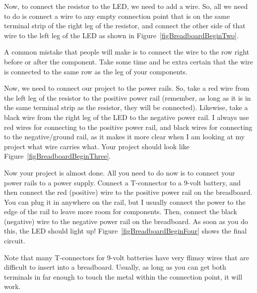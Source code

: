 Now, to connect the resistor to the LED, we need to add a wire.
So, all we need to do is connect a wire to any empty connection point that is on the same terminal strip of the right leg of the resistor, and connect the other side of that wire to the left leg of the LED as shown in Figure~\ref{figBreadboardBeginTwo}.


A common mistake that people will make is to connect the wire to the row right before or after the component.
Take some time and be extra certain that the wire is connected to the same row as the leg of your components.

Now, we need to connect our project to the power rails.
So, take a red wire from the left leg of the resistor to the positive power rail (remember, as long as it is in the same terminal strip as the resistor, they will be connected).
Likewise, take a black wire from the right leg of the LED to the negative power rail.
I always use red wires for connecting to the positive power rail, and black wires for connecting to the negative/ground rail, as it makes it more clear when I am looking at my project what wire carries what.
Your project should look like Figure~\ref{figBreadboardBeginThree}.


Now your project is almost done.
All you need to do now is to connect your power rails to a power supply.
Connect a T-connector to a 9-volt battery, and then connect the red (positive) wire to the positive power rail on the breadboard.  You can plug it in anywhere on the rail, but I usually connect the power to the edge of the rail to leave more room for components.
Then, connect the black (negative) wire to the negative power rail on the breadboard.
As soon as you do this, the LED should light up!
Figure~\ref{figBreadboardBeginFour} shows the final circuit.


Note that many T-connectors for 9-volt batteries have very flimsy wires that are difficult to insert into a breadboard.
Usually, as long as you can get both terminals in far enough to touch the metal within the connection point, it will work.


